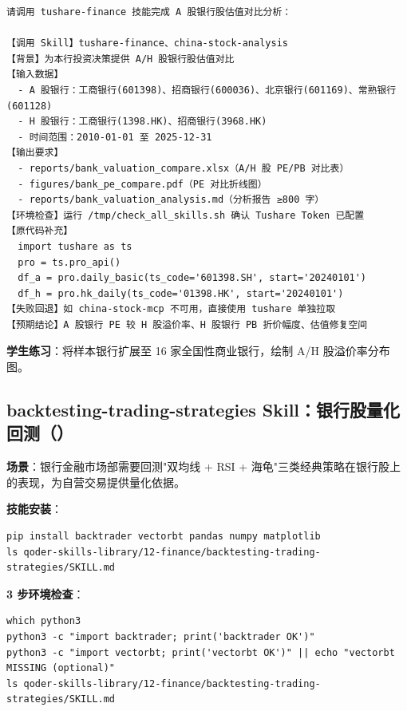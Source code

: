 \begin{lstlisting}
请调用 tushare-finance 技能完成 A 股银行股估值对比分析：

【调用 Skill】tushare-finance、china-stock-analysis
【背景】为本行投资决策提供 A/H 股银行股估值对比
【输入数据】
  - A 股银行：工商银行(601398)、招商银行(600036)、北京银行(601169)、常熟银行(601128)
  - H 股银行：工商银行(1398.HK)、招商银行(3968.HK)
  - 时间范围：2010-01-01 至 2025-12-31
【输出要求】
  - reports/bank_valuation_compare.xlsx（A/H 股 PE/PB 对比表）
  - figures/bank_pe_compare.pdf（PE 对比折线图）
  - reports/bank_valuation_analysis.md（分析报告 ≥800 字）
【环境检查】运行 /tmp/check_all_skills.sh 确认 Tushare Token 已配置
【原代码补充】
  import tushare as ts
  pro = ts.pro_api()
  df_a = pro.daily_basic(ts_code='601398.SH', start='20240101')
  df_h = pro.hk_daily(ts_code='01398.HK', start='20240101')
【失败回退】如 china-stock-mcp 不可用，直接使用 tushare 单独拉取
【预期结论】A 股银行 PE 较 H 股溢价率、H 股银行 PB 折价幅度、估值修复空间
\end{lstlisting}

\textbf{学生练习}：将样本银行扩展至 16 家全国性商业银行，绘制 A/H 股溢价率分布图。

\subsection{backtesting-trading-strategies Skill：银行股量化回测（）}

\textbf{场景}：银行金融市场部需要回测"双均线 + RSI + 海龟"三类经典策略在银行股上的表现，为自营交易提供量化依据。

\textbf{技能安装}：

\begin{lstlisting}[style=shell]
pip install backtrader vectorbt pandas numpy matplotlib
ls qoder-skills-library/12-finance/backtesting-trading-strategies/SKILL.md
\end{lstlisting}

\textbf{3 步环境检查}：
\begin{lstlisting}[style=shell]
which python3
python3 -c "import backtrader; print('backtrader OK')"
python3 -c "import vectorbt; print('vectorbt OK')" || echo "vectorbt MISSING (optional)"
ls qoder-skills-library/12-finance/backtesting-trading-strategies/SKILL.md
\end{lstlisting}

